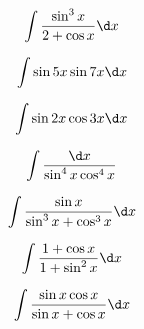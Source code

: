 \begin{question}
    \begin{equation*}
        \int \frac{\sin^3 x}{2 + \cos x} \d x
    \end{equation*}
\end{question}

\begin{question}
    \begin{equation*}
        \int \sin 5x \sin 7x \d x
    \end{equation*}
\end{question}

\begin{question}
    \begin{equation*}
        \int \sin 2x \cos 3x \d x
    \end{equation*}
\end{question}

\begin{question}
    \begin{equation*}
        \int \frac{\d x}{\sin^4 x \cos^4 x}
    \end{equation*}
\end{question}

\begin{question}
    \begin{equation*}
        \int \frac{\sin x}{\sin^3 x + \cos^3 x} \d x
    \end{equation*}
\end{question}

\begin{question}
    \begin{equation*}
        \int \frac{1 + \cos x}{1 + \sin^2 x} \d x
    \end{equation*}
\end{question}

\begin{question}
    \begin{equation*}
        \int \frac{\sin x \cos x}{\sin x + \cos x} \d x
    \end{equation*}
\end{question}
